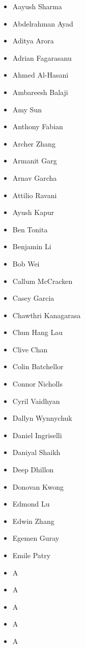 \documentclass[main.tex]{subfiles}
\begin{document}
\begin{multicols}{4}
 \begin{itemize}[label={},noitemsep]
     \item {Aayush Sharma}
     \item {Abdelrahman Ayad}
     \item {Aditya Arora}
     \item {Adrian Fagarasanu}
     \item {Ahmed Al-Hasani}
	 \item {Ambareesh Balaji}
     \item {Amy Sun}
	 \item {Anthony Fabian}
     \item {Archer Zhang}
	 \item {Armanit Garg}
     \item {Arnav Garcha}
	 \item {Attilio Ravani}
     \item {Ayush Kapur}
	 \item {Ben Tonita}
     \item {Benjamin Li}
	 \item {Bob Wei}
     \item {Callum McCracken}
	 \item {Casey Garcia}
     \item {Chawthri Kanagarasa}
	 \item {Chun Hang Lau}
     \item {Clive Chan}
	 \item {Colin Batchellor}
     \item {Connor Nicholls}
	 \item {Cyril Vaidhyan}
     \item {Dallyn Wynnychuk}
	 \item {Daniel Ingriselli}
     \item {Daniyal Shaikh}
	 \item {Deep Dhillon}
     \item {Donovan Kwong}
	 \item {Edmond Lu}
     \item {Edwin Zhang}
	 \item {Egemen Guray}
     \item {Emile Patry}
	 \item {A}
     \item {A}
	 \item {A}
     \item {A}
	 \item {A}

\end{itemize}
\end{multicols}
\end{document}
